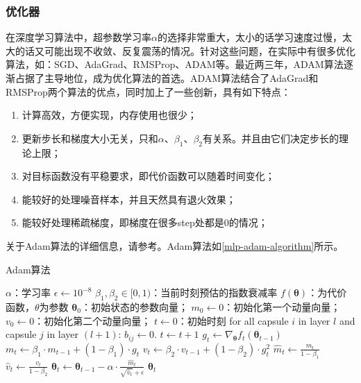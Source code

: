 \documentclass[UTF8]{article}
\begin{document}
\subsubsection{优化器}
在深度学习算法中，超参数学习率$\alpha$的选择非常重大，太小的话学习速度过慢，太大的话又可能出现不收敛、反复震荡的情况。针对这些问题，在实际中有很多优化算法，如：SGD、AdaGrad、RMSProp、ADAM等。最近两三年，ADAM算法逐渐占据了主导地位，成为优化算法的首选。ADAM算法结合了AdaGrad和RMSProp两个算法的优点，同时加上了一些创新，具有如下特点：
\begin{enumerate}
\item 计算高效，方便实现，内存使用也很少；
\item 更新步长和梯度大小无关，只和$\alpha$、$\beta_1$、$\beta_2$有关系。并且由它们决定步长的理论上限；
\item 对目标函数没有平稳要求，即代价函数可以随着时间变化；
\item 能较好的处理噪音样本，并且天然具有退火效果；
\item 能较好处理稀疏梯度，即梯度在很多step处都是0的情况；
\end{enumerate}
关于Adam算法的详细信息，请参考\cite{r000005}。Adam算法如\ref{mlp-adam-algorithm}所示。
\begin{algorithm}
\caption{Adam算法}\label{mlp-adam-algorithm}
\begin{algorithmic}[L]
\Require $\alpha$：学习率
\Require $\epsilon \leftarrow 10^{-8}$
\Require  $\beta_{1}, \beta_{2} \in [0, 1)$：当前时刻预估的指数衰减率
\Require $f(\boldsymbol{\theta})$：为代价函数，$\theta$为参数
\Require $\boldsymbol{\theta}_{0}$：初始状态的参数向量；\newline
$m_{0} \leftarrow 0$：初始化第一个动量向量；\newline
$v_{0} \leftarrow 0$：初始化第二个动量向量；\newline
$t \leftarrow 0$：初始时刻
\State for all capsule $i$ in layer $l$ and capsule $j$ in layer $(l+1)$: $b_{ij} \gets 0$.
\State $t \leftarrow t+1$
\State $g_{t} \leftarrow \nabla_{\boldsymbol{\theta}}f_{t}(\boldsymbol{\theta}_{t-1})$
\State $m_{t} \leftarrow \beta_{1} \cdot m_{t-1}+(1-\beta_{1}) \cdot g_{t}$
\State $v_{t} \leftarrow \beta_{2} \cdot v_{t-1}+(1-\beta_{2}) \cdot g_{t}^{2}$
\State $\hat{m}_{t} \leftarrow \frac{m_{t}}{1-\beta_{1}}$
\State $\hat{v}_{t} \leftarrow \frac{v_{t}}{1-\beta_{2}}$
\State $\boldsymbol{\theta}_{t} \leftarrow \boldsymbol{\theta}_{t-1} - \alpha \cdot \frac{\hat{m}_{t}}{\sqrt{\hat{v}_{t}} + \epsilon}$
\EndWhile
\Return $\boldsymbol{\theta}_{t}$
\EndProcedure
\end{algorithmic}
\end{algorithm}
\end{document}
